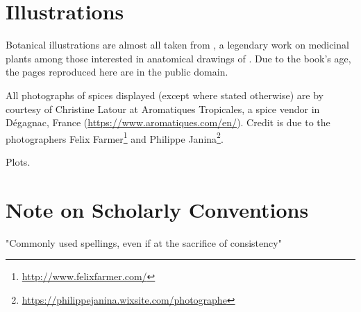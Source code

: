 

\section{Illustrations}

Botanical illustrations are almost all taken from \textcite{kohler_kohlers_1887}, a legendary work on medicinal plants among those interested in anatomical drawings of . Due to the book's age, the pages reproduced here are in the public domain. %

All photographs of spices displayed (except where stated otherwise) are by courtesy of Christine Latour at Aromatiques Tropicales, a spice vendor in Dégagnac, France (\url{https://www.aromatiques.com/en/}). Credit is due to the photographers Felix Farmer\footnote{\url{http://www.felixfarmer.com/}} and Philippe Janina\footnote{\url{https://philippejanina.wixsite.com/photographe}}.

Plots.

\section{Note on Scholarly Conventions}

"Commonly used spellings, even if at the sacrifice of consistency"